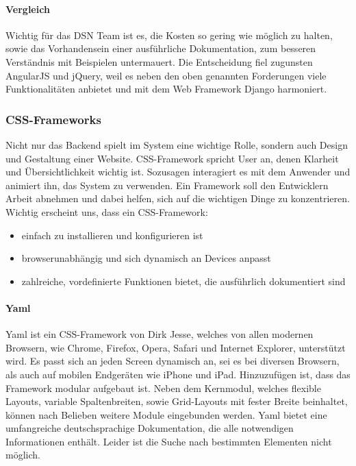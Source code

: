 \paragraph{Vergleich}
Wichtig für das DSN Team ist es, die Kosten so gering wie möglich zu halten, sowie das Vorhandensein einer ausführliche Dokumentation, zum besseren Verständnis mit Beispielen untermauert. Die Entscheidung fiel zugunsten AngularJS und jQuery, weil es neben den oben genannten Forderungen viele Funktionalitäten anbietet und mit dem Web Framework Django harmoniert.

\subsubsection{CSS-Frameworks}
Nicht nur das Backend spielt im System eine wichtige Rolle, sondern auch Design und Gestaltung einer Website. CSS-Framework 
spricht User an, denen Klarheit und Übersichtlichkeit wichtig ist. Sozusagen interagiert es mit dem Anwender und animiert ihn, das System zu verwenden. Ein Framework soll den Entwicklern Arbeit abnehmen und dabei helfen, sich auf die wichtigen Dinge zu konzentrieren.\\
Wichtig erscheint uns, dass ein CSS-Framework:
\begin{itemize}
\item einfach zu installieren und konfigurieren ist
\item browserunabhängig und sich dynamisch an Devices anpasst
\item zahlreiche, vordefinierte Funktionen bietet, die ausführlich dokumentiert sind
\end{itemize}

\newpage

\paragraph{Yaml}
Yaml ist ein CSS-Framework von Dirk Jesse, welches von allen modernen Browsern, wie Chrome, Firefox, Opera, Safari und Internet Explorer, unterstützt wird. Es passt sich an jeden Screen dynamisch an, sei es bei diversen Browsern, als auch auf mobilen Endgeräten wie iPhone und iPad. Hinzuzufügen ist, dass das Framework modular aufgebaut ist. Neben dem Kernmodul, welches flexible Layouts, variable Spaltenbreiten, sowie Grid-Layouts mit fester Breite beinhaltet, können nach Belieben weitere Module eingebunden werden. Yaml bietet eine umfangreiche deutschsprachige Dokumentation, die alle notwendigen Informationen enthält. Leider ist die Suche nach bestimmten Elementen nicht möglich. \cite{YAML}

